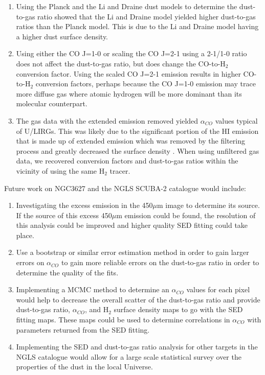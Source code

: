 \begin{enumerate}
\item{Using the Planck and the Li and Draine dust models to determine the dust-to-gas ratio showed that the Li and Draine model yielded higher dust-to-gas ratios than the Planck model.  This is due to the Li and Draine model having a higher dust surface density.}

\item{Using either the CO J=1-0 or scaling the CO J=2-1 using a 2-1/1-0 ratio does not affect the dust-to-gas ratio, but does change the CO-to-H$_2$ conversion factor.  Using the scaled CO J=2-1 emission results in higher CO-to-H$_2$ conversion factors, perhaps because the CO J=1-0 emission may trace more diffuse gas \citep{wilson1990} where atomic hydrogen will be more dominant than its molecular counterpart.}

\item{The gas data with the extended emission removed yielded $\alpha_{CO}$ values typical of U/LIRGs.  This was likely due to the significant portion of the HI emission that is made up of extended emission which was removed by the filtering process and greatly decreased the surface density .  When using unfiltered gas data, we recovered conversion factors and dust-to-gas ratios within the vicinity of \cite{sandstrom2013} using the same H$_2$ tracer.}

\end{enumerate}

Future work on NGC3627 and the NGLS SCUBA-2 catalogue would include:

\begin{enumerate}

\item{Investigating the excess emission in the 450$\mu$m image to determine its source.  If the source of this excess 450$\mu$m emission could be found, the resolution of this analysis could be improved and higher quality SED fitting could take place.}

\item{Use a bootstrap or similar error estimation method in order to gain larger errors on $\alpha_{CO}$ to gain more reliable errors on the dust-to-gas ratio in order to determine the quality of the fits.}

\item{Implementing a MCMC method to determine an $\alpha_{CO}$ values for each pixel would help to decrease the overall scatter of the dust-to-gas ratio and provide dust-to-gas ratio, $\alpha_{CO}$, and H$_2$ surface density maps to go with the SED fitting maps.  These maps could be used to determine correlations in $\alpha_{CO}$ with parameters returned from the SED fitting.}

\item{Implementing the SED and dust-to-gas ratio analysis for other targets in the NGLS catalogue would allow for a large scale statistical survey over the properties of the dust in the local Universe.}

\end{enumerate}